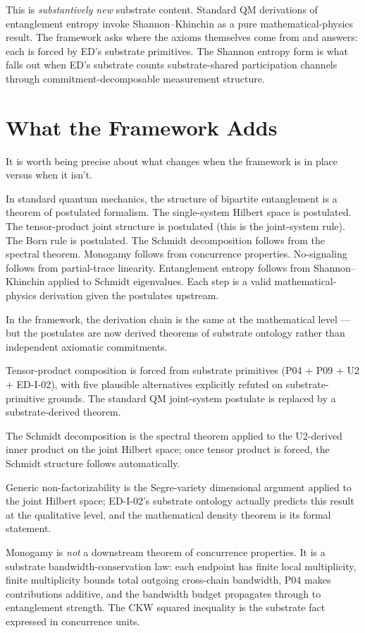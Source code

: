 \documentclass[11pt,a4paper]{article}
\begin{document}
This is \emph{substantively new} substrate content. Standard QM derivations of entanglement entropy invoke Shannon--Khinchin as a pure mathematical-physics result. The framework asks where the axioms themselves come from and answers: each is forced by ED's substrate primitives. The Shannon entropy form is what falls out when ED's substrate counts substrate-shared participation channels through commitment-decomposable measurement structure.

\section{What the Framework Adds}

It is worth being precise about what changes when the framework is in place versus when it isn't.

In standard quantum mechanics, the structure of bipartite entanglement is a theorem of postulated formalism. The single-system Hilbert space is postulated. The tensor-product joint structure is postulated (this is the joint-system rule). The Born rule is postulated. The Schmidt decomposition follows from the spectral theorem. Monogamy follows from concurrence properties. No-signaling follows from partial-trace linearity. Entanglement entropy follows from Shannon--Khinchin applied to Schmidt eigenvalues. Each step is a valid mathematical-physics derivation given the postulates upstream.

In the framework, the derivation chain is the same at the mathematical level --- but the postulates are now derived theorems of substrate ontology rather than independent axiomatic commitments.

Tensor-product composition is forced from substrate primitives (P04 + P09 + U2 + ED-I-02), with five plausible alternatives explicitly refuted on substrate-primitive grounds. The standard QM joint-system postulate is replaced by a substrate-derived theorem.

The Schmidt decomposition is the spectral theorem applied to the U2-derived inner product on the joint Hilbert space; once tensor product is forced, the Schmidt structure follows automatically.

Generic non-factorizability is the Segre-variety dimensional argument applied to the joint Hilbert space; ED-I-02's substrate ontology actually predicts this result at the qualitative level, and the mathematical density theorem is its formal statement.

Monogamy is \emph{not} a downstream theorem of concurrence properties. It is a substrate bandwidth-conservation law: each endpoint has finite local multiplicity, finite multiplicity bounds total outgoing cross-chain bandwidth, P04 makes contributions additive, and the bandwidth budget propagates through to entanglement strength. The CKW squared inequality is the substrate fact expressed in concurrence units.
\end{document}
